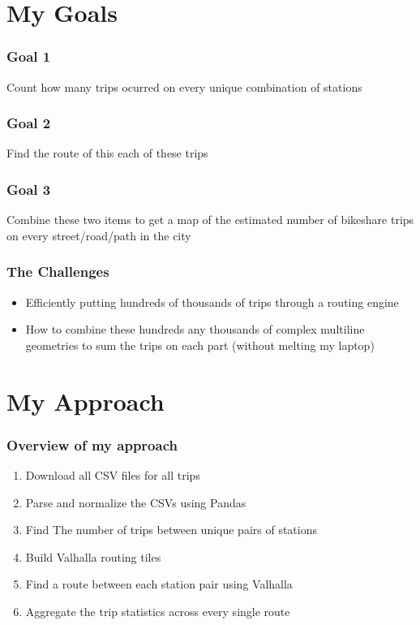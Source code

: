 \documentclass[aspectratio=169]{beamer}
\begin{document}
\section{My Goals}
\begin{frame}
    \frametitle{Goal 1}

    Count how many trips ocurred on every unique combination of stations

\end{frame}

\begin{frame}
    \frametitle{Goal 2}

    Find the route of this each of these trips

\end{frame}
\begin{frame}
    \frametitle{Goal 3}
    Combine these two items to get a map of the estimated number of bikeshare trips on every street/road/path in the city
\end{frame}


\begin{frame}
    \frametitle{The Challenges}
    \begin{itemize}
        \item Efficiently putting hundreds of thousands of trips through a routing engine
        \item How to combine these hundreds any thousands of complex multiline geometries to sum the trips on each part (without melting my laptop)
    \end{itemize}
\end{frame}

\section{My Approach}

\begin{frame}
    \frametitle{Overview of my approach}
    \begin{enumerate}
        \item Download all CSV files for all trips
        \item Parse and normalize the CSVs using Pandas
        \item Find The number of trips between unique pairs of stations
        \item Build Valhalla routing tiles
        \item Find a route between each station pair using Valhalla
        \item Aggregate the trip statistics across every single route
    \end{enumerate}
\end{frame}
\end{document}
